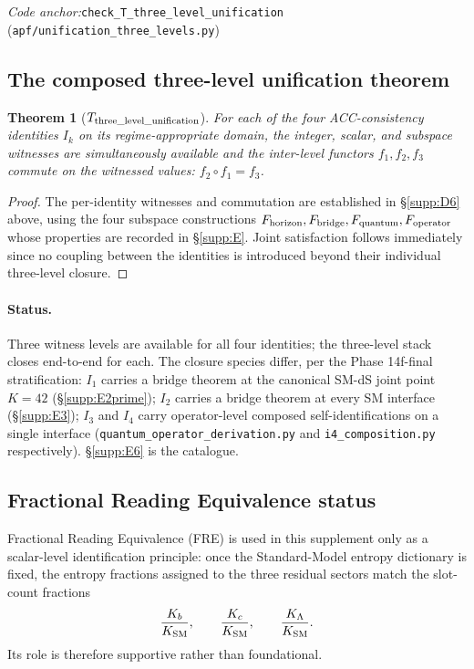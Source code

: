 \documentclass[11pt]{article}
\theoremstyle{plain}
\newtheorem{theorem}{Theorem}[section]
\theoremstyle{definition}
\theoremstyle{remark}
\newcommand{\coderef}[2]{\par\noindent\textit{Code anchor:}\quad\texttt{#1} (\texttt{#2})}
\begin{document}
\coderef{check\_T\_three\_level\_unification}{apf/unification\_three\_levels.py}

\bigskip

\subsection{The composed three-level unification theorem}\label{supp:D7}

\begin{theorem}[$T_{\rm three\_level\_unification}$]\label{thm:three_level}
For each of the four ACC-consistency identities $I_k$ on its regime-appropriate domain, the integer, scalar, and subspace witnesses are simultaneously available and the inter-level functors $f_1, f_2, f_3$ commute on the witnessed values: $f_2 \circ f_1 = f_3$.
\end{theorem}

\begin{proof}
The per-identity witnesses and commutation are established in \S\ref{supp:D6} above, using the four subspace constructions $F_{\rm horizon}, F_{\rm bridge}, F_{\rm quantum}, F_{\rm operator}$ whose properties are recorded in \S\ref{supp:E}.  Joint satisfaction follows immediately since no coupling between the identities is introduced beyond their individual three-level closure.
\end{proof}

\paragraph{Status.}
Three witness levels are available for all four identities; the three-level stack closes end-to-end for each.  The closure species differ, per the Phase 14f-final stratification: $I_1$ carries a bridge theorem at the canonical SM-dS joint point $K = 42$ (\S\ref{supp:E2prime}); $I_2$ carries a bridge theorem at every SM interface (\S\ref{supp:E3}); $I_3$ and $I_4$ carry operator-level composed self-identifications on a single interface (\texttt{quantum\_operator\_derivation.py} and \texttt{i4\_composition.py} respectively).  \S\ref{supp:E6} is the catalogue.

\bigskip

\subsection{Fractional Reading Equivalence status}\label{supp:D8}

Fractional Reading Equivalence (FRE) is used in this supplement only as a scalar-level identification principle: once the Standard-Model entropy dictionary is fixed, the entropy fractions assigned to the three residual sectors match the slot-count fractions
\[
\frac{K_b}{K_{\rm SM}},\qquad
\frac{K_c}{K_{\rm SM}},\qquad
\frac{K_\Lambda}{K_{\rm SM}}.
\]
Its role is therefore supportive rather than foundational.
\end{document}
